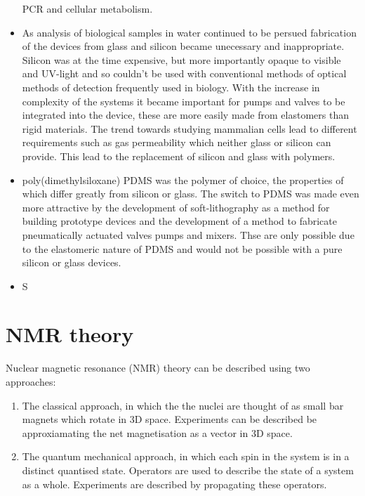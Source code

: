 \begin{itemize}
  PCR\citep{woolley1996functional} and cellular metabolism\citep{bousse1994micromachined}.
  \item As analysis of biological samples in water continued to be persued fabrication of the devices
  from glass and silicon became unecessary and inappropriate. Silicon was at the time expensive, but more
  importantly opaque to visible and UV-light and so couldn't be used with conventional methods of optical
  methods of detection frequently used in biology. With the increase in complexity of the systems it became
  important for pumps and valves to be integrated into the device, these are more easily made from elastomers
  than rigid materials. The trend towards studying mammalian cells lead to different requirements such as gas
  permeability which neither glass or silicon can provide. This lead to the replacement of silicon and glass with
  polymers\citep{RN5}.
  \item poly(dimethylsiloxane) PDMS was the polymer of choice, the properties of which differ greatly
  from silicon or glass\citep{ng2002components,whitesides2001flexible}. The switch to PDMS was made even
  more attractive by the development of soft-lithography as a method for building prototype
  devices\citep{mcdonald2000fabrication} and the development of a method to fabricate pneumatically actuated valves
  pumps and mixers\citep{mcdonald2000fabrication}. Thse are only possible due to the elastomeric nature of PDMS
  and would not be possible with a pure silicon or glass devices.
  \item S


\end{itemize}

\section{NMR theory}

Nuclear magnetic resonance (NMR) theory can be described using two approaches:
\begin{enumerate}
  \item The classical approach, in which the the nuclei are thought of as small bar magnets which
  rotate in 3D space. Experiments can be described be approxiamating the net magnetisation as a
  vector in 3D space.
  \item The quantum mechanical approach, in which each spin in the system is in a distinct quantised state.
  Operators are used to describe the state of a system as a whole. Experiments are described by propagating
  these operators.
\end{enumerate}


